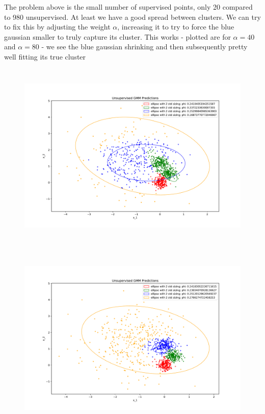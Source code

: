 \begin{answer}
The problem above is the small number of supervised points, only 20 compared to 980 unsupervised. At least we have a good spread between clusters.
We can try to fix this by adjusting the weight $\alpha$, increasing it to try to force the blue gaussian smaller to truly capture its cluster. This works - plotted are for $\alpha=40$ and $\alpha=80$ - we see the blue gaussian shrinking and then subsequently pretty well fitting its true cluster

\begin{figure}[H]
	\includegraphics[width=15cm,height=9cm,keepaspectratio]{../src/semi_supervised_em/pred_alpha_40_ss.pdf}
\end{figure}

\begin{figure}[H]
	\includegraphics[width=15cm,height=9cm,keepaspectratio]{../src/semi_supervised_em/pred_alpha_80_ss.pdf}
\end{figure}

\end{answer}

